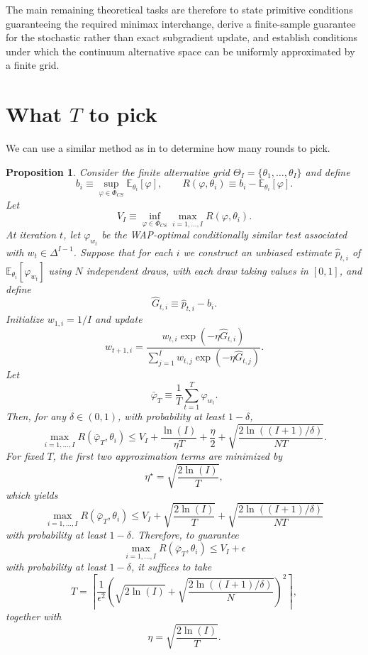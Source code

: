 \documentclass{article}
\theoremstyle{definition}
\theoremstyle{plain}
\newtheorem{prop}{Proposition}
\theoremstyle{remark}
\begin{document}
The main remaining theoretical tasks are therefore to state primitive conditions guaranteeing the required minimax interchange, derive a finite-sample guarantee for the stochastic rather than exact subgradient update, and establish conditions under which the continuum alternative space can be uniformly approximated by a finite grid.

\section{What $T$ to pick}
We can use a similar method as in \cite{aradillas2025approximate} to determine how many rounds to pick.


\begin{prop}
Consider the finite alternative grid $\Theta_I=\{\theta_1,\ldots,\theta_I\}$ and define
\[
b_i\equiv\sup_{\varphi\in\Phi_{CS}}\mathbb{E}_{\theta_i}[\varphi],\qquad R(\varphi,\theta_i)\equiv b_i-\mathbb{E}_{\theta_i}[\varphi].
\]
Let
\[
V_I\equiv\inf_{\varphi\in\Phi_{CS}}\max_{i=1,\ldots,I}R(\varphi,\theta_i).
\]
At iteration $t$, let $\varphi_{w_t}$ be the WAP-optimal conditionally similar test associated with $w_t\in\Delta^{I-1}$. Suppose that for each $i$ we construct an unbiased estimate $\widehat p_{t,i}$ of $\mathbb{E}_{\theta_i}[\varphi_{w_t}]$ using $N$ independent draws, with each draw taking values in $[0,1]$, and define
\[
\widehat G_{t,i}\equiv\widehat p_{t,i}-b_i.
\]
Initialize $w_{1,i}=1/I$ and update
\[
w_{t+1,i}=\frac{w_{t,i}\exp(-\eta\widehat G_{t,i})}{\sum_{j=1}^I w_{t,j}\exp(-\eta\widehat G_{t,j})}.
\]
Let
\[
\bar{\varphi}_T\equiv\frac{1}{T}\sum_{t=1}^T\varphi_{w_t}.
\]
Then, for any $\delta\in(0,1)$, with probability at least $1-\delta$,
\[
\max_{i=1,\ldots,I}R(\bar{\varphi}_T,\theta_i)\leq V_I+\frac{\ln(I)}{\eta T}+\frac{\eta}{2}+\sqrt{\frac{2\ln((I+1)/\delta)}{NT}}.
\]
For fixed $T$, the first two approximation terms are minimized by
\[
\eta^\star=\sqrt{\frac{2\ln(I)}{T}},
\]
which yields
\[
\max_{i=1,\ldots,I}R(\bar{\varphi}_T,\theta_i)\leq V_I+\sqrt{\frac{2\ln(I)}{T}}+\sqrt{\frac{2\ln((I+1)/\delta)}{NT}}
\]
with probability at least $1-\delta$. Therefore, to guarantee
\[
\max_{i=1,\ldots,I}R(\bar{\varphi}_T,\theta_i)\leq V_I+\epsilon
\]
with probability at least $1-\delta$, it suffices to take
\[
T=\left\lceil\frac{1}{\epsilon^2}\left(\sqrt{2\ln(I)}+\sqrt{\frac{2\ln((I+1)/\delta)}{N}}\right)^2\right\rceil,
\]
together with
\[
\eta=\sqrt{\frac{2\ln(I)}{T}}.
\]
\end{prop}
\end{document}
